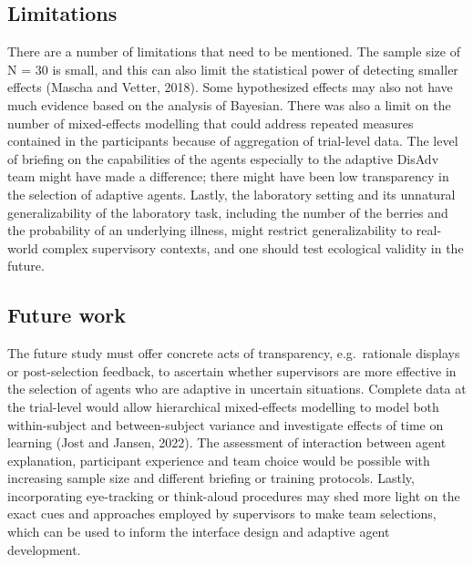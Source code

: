 \documentclass[
]{article}
\begin{document}
\subsection{Limitations}\label{limitations}

There are a number of limitations that need to be mentioned. The sample
size of N = 30 is small, and this can also limit the statistical power
of detecting smaller effects (Mascha and Vetter, 2018). Some
hypothesized effects may also not have much evidence based on the
analysis of Bayesian. There was also a limit on the number of
mixed-effects modelling that could address repeated measures contained
in the participants because of aggregation of trial-level data. The
level of briefing on the capabilities of the agents especially to the
adaptive DisAdv team might have made a difference; there might have been
low transparency in the selection of adaptive agents. Lastly, the
laboratory setting and its unnatural generalizability of the laboratory
task, including the number of the berries and the probability of an
underlying illness, might restrict generalizability to real-world
complex supervisory contexts, and one should test ecological validity in
the future.

\subsection{Future work}\label{future-work}

The future study must offer concrete acts of transparency,
e.g.~rationale displays or post-selection feedback, to ascertain whether
supervisors are more effective in the selection of agents who are
adaptive in uncertain situations. Complete data at the trial-level would
allow hierarchical mixed-effects modelling to model both within-subject
and between-subject variance and investigate effects of time on learning
(Jost and Jansen, 2022). The assessment of interaction between agent
explanation, participant experience and team choice would be possible
with increasing sample size and different briefing or training
protocols. Lastly, incorporating eye-tracking or think-aloud procedures
may shed more light on the exact cues and approaches employed by
supervisors to make team selections, which can be used to inform the
interface design and adaptive agent development.
\end{document}
